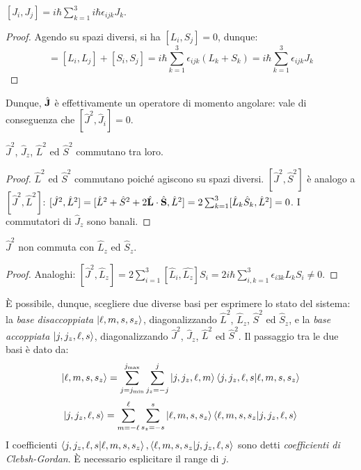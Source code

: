 \begin{proposition}
	$ [J_i,J_j] = i\hbar \sum_{k = 1}^{3} i \hbar \epsilon_{ijk} J_k $.
\end{proposition}
\begin{proof}
	Agendo su spazi diversi, si ha $ [L_i,S_j] = 0 $, dunque:
	\begin{equation*}
		[J_i,J_j] = [L_i,L_j] + [S_i,S_j] = i\hbar \sum_{k = 1}^{3} \epsilon_{ijk} (L_k + S_k) = i\hbar \sum_{k = 1}^{3} \epsilon_{ijk} J_k
	\end{equation*}
\end{proof}

Dunque, $ \hat{\mathbf{J}} $ è effettivamente un operatore di momento angolare: vale di conseguenza che $ [\hat{J}^2,\hat{J}_i] = 0 $.

\begin{proposition}
	$ \hat{J}^2 $, $ \hat{J}_z $, $ \hat{L}^2 $ ed $ \hat{S}^2 $ commutano tra loro.
\end{proposition}
\begin{proof}
	$ \hat{L}^2 $ ed $ \hat{S}^2 $ commutano poiché agiscono su spazi diversi. $ [\hat{J}^2,\hat{S}^2] $ è analogo a $ [\hat{J}^2,\hat{L}^2] $: $ [\hat{J}^2,\hat{L}^2] = [\hat{L}^2 + \hat{S}^2 + 2 \hat{\mathbf{L}}\cdot\hat{\mathbf{S}},\hat{L}^2] = 2 \sum_{k = 1}^{3} [\hat{L}_k \hat{S}_k,\hat{L}^2] = 0 $. I commutatori di $ \hat{J}_z $ sono banali.
\end{proof}

\begin{proposition}
	$ \hat{J}^2 $ non commuta con $ \hat{L}_z $ ed $ \hat{S}_z $.
\end{proposition}
\begin{proof}
	Analoghi: $ [\hat{J}^2,\hat{L}_z] = 2 \sum_{i = 1}^{3} [\hat{L}_i,\hat{L_z}]S_i = 2i\hbar \sum_{i,k = 1}^{3} \epsilon_{i3k} L_k S_i \neq 0 $.
\end{proof}

È possibile, dunque, scegliere due diverse basi per esprimere lo stato del sistema: la \textit{base disaccoppiata} $ \ket{\ell,m,s,s_z} $, diagonalizzando $ \hat{L}^2 $, $ \hat{L}_z $, $ \hat{S}^2 $ ed $ \hat{S}_z $, e la \textit{base accoppiata} $ \ket{j,j_z,\ell,s} $, diagonalizzando $ \hat{J}^2 $, $ \hat{J}_z $, $ \hat{L}^2 $ ed $ \hat{S}^2 $. Il passaggio tra le due basi è dato da:
\begin{equation}
	\ket{\ell,m,s,s_z} = \sum_{j = j_{\text{min}}}^{j_{\text{max}}} \sum_{j_z = -j}^{j} \ket{j,j_z,\ell,m} \braket{j,j_z,\ell,s | \ell,m,s,s_z}
	\label{eq:2.56}
\end{equation}
\begin{equation}
	\ket{j,j_z,\ell,s} = \sum_{m = -\ell}^{\ell} \sum_{s_z = -s}^{s} \ket{\ell,m,s,s_z} \braket{\ell,m,s,s_z | j,j_z,\ell,s}
	\label{eq:2.57}
\end{equation}
I coefficienti $ \braket{j,j_z,\ell,s | \ell,m,s,s_z}, \braket{\ell,m,s,s_z | j,j_z,\ell,s} $ sono detti \textit{coefficienti di Clebsh-Gordan}. È necessario esplicitare il range di $ j $.


